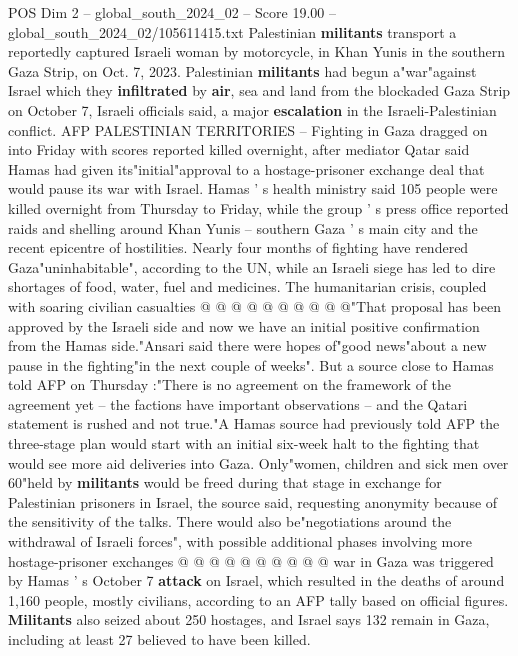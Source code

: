 \begin{textsample}{POS Dim 2 – global\_south\_2024\_02 – Score 19.00 – global\_south\_2024\_02/105611415.txt}  \label{ex:f2_pos_196}
Palestinian \textbf{militants} transport a reportedly captured Israeli woman by motorcycle, in Khan Yunis in the southern Gaza Strip, on Oct. 7, 2023.
Palestinian \textbf{militants} had begun a"war"against Israel which they \textbf{infiltrated} by \textbf{air}, sea and land from the blockaded Gaza Strip on October 7, Israeli officials said, a major \textbf{escalation} in the Israeli-Palestinian conflict.
AFP PALESTINIAN TERRITORIES -- Fighting in Gaza dragged on into Friday with scores reported killed overnight, after mediator Qatar said Hamas had given its"initial"approval to a hostage-prisoner exchange deal that would pause its war with Israel.
Hamas ' s health ministry said 105 people were killed overnight from Thursday to Friday, while the group ' s press office reported raids and shelling around Khan Yunis -- southern Gaza ' s main city and the recent epicentre of hostilities.
Nearly four months of fighting have rendered Gaza"uninhabitable", according to the UN, while an Israeli siege has led to dire shortages of food, water, fuel and medicines.
The humanitarian crisis, coupled with soaring civilian casualties @ @ @ @ @ @ @ @ @ @"That proposal has been approved by the Israeli side and now we have an initial positive confirmation from the Hamas side."Ansari said there were hopes of"good news"about a new pause in the fighting"in the next couple of weeks".
But a source close to Hamas told AFP on Thursday :"There is no agreement on the framework of the agreement yet -- the factions have important observations -- and the Qatari statement is rushed and not true."A Hamas source had previously told AFP the three-stage plan would start with an initial six-week halt to the fighting that would see more aid deliveries into Gaza.
Only"women, children and sick men over 60"held by \textbf{militants} would be freed during that stage in exchange for Palestinian prisoners in Israel, the source said, requesting anonymity because of the sensitivity of the talks.
There would also be"negotiations around the withdrawal of Israeli forces", with possible additional phases involving more hostage-prisoner exchanges @ @ @ @ @ @ @ @ @ @ war in Gaza was triggered by Hamas ' s October 7 \textbf{attack} on Israel, which resulted in the deaths of around 1,160 people, mostly civilians, according to an AFP tally based on official figures. \textbf{Militants} also seized about 250 hostages, and Israel says 132 remain in Gaza, including at least 27 believed to have been killed.

\end{textsample}
